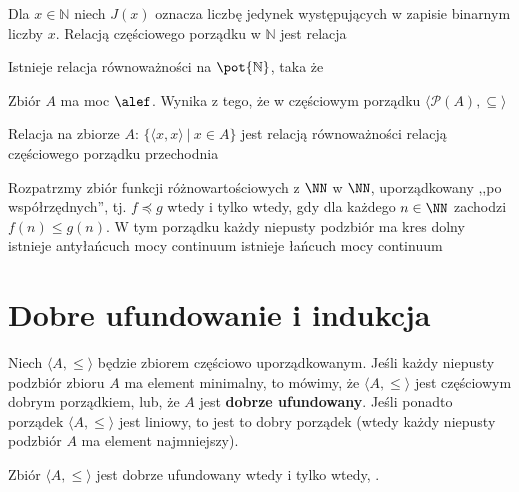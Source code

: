 \begin{problems}
    \prob Dla $x \in \mathbb{N}$ niech $J(x)$ oznacza liczbę jedynek występujących w zapisie binarnym liczby $x$. Relacją częściowego porządku w $\mathbb{N}$ jest relacja

    \prob Istnieje relacja równoważności na $\pot{\mathbb{N}}$, taka że

    \prob Zbiór $A$ ma moc $\alef$. Wynika z tego, że w częściowym porządku $\langle\mathcal{P}(A),\subseteq\rangle$

    \prob Relacja na zbiorze $A$: $\{\langle x, x\rangle \ | \ x \in A\}$ jest
    \answers
    {relacją równoważności}
    {relacją częściowego porządku}
    {przechodnia}

    \prob Rozpatrzmy zbiór funkcji różnowartościowych z $\NN$ w $\NN$, uporządkowany ,,po współrzędnych'', tj. $f \preceq g$ wtedy i tylko wtedy, gdy dla każdego $n \in \NN$ zachodzi $f(n) \leq g(n)$. W tym porządku
    \answers
    {każdy niepusty podzbiór ma kres dolny}
    {istnieje antyłańcuch mocy continuum}
    {istnieje łańcuch mocy continuum}
\end{problems}







\section{Dobre ufundowanie i indukcja}

Niech $\langle A, \leq \rangle$ będzie zbiorem częściowo uporządkowanym. Jeśli każdy niepusty podzbiór zbioru $A$ ma element minimalny, to mówimy, że $\langle A, \leq \rangle$ jest częściowym dobrym porządkiem, lub, że $A$ jest \textbf{dobrze ufundowany}. Jeśli ponadto porządek $\langle A, \leq \rangle$ jest liniowy, to jest to dobry porządek (wtedy każdy niepusty podzbiór $A$ ma element najmniejszy).

Zbiór $\langle A, \leq \rangle$ jest dobrze ufundowany wtedy i tylko wtedy, .

